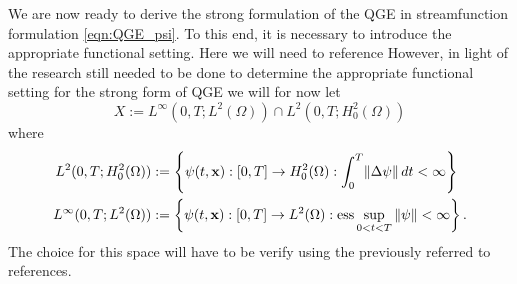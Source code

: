 We are now ready to derive the strong formulation of the QGE in streamfunction
formulation \eqref{eqn:QGE_psi}. To this end, it is necessary to introduce the
appropriate functional setting.  Here we will need to reference \cite{Braess,
Ciarlet, Cascon, GunzburgerApprox, GunzburgerMethods, Gunzburger89, Layton08,
Girault79, Girault79, Medjo99} However, in light of the research still needed to
be done to determine the appropriate functional setting for the strong form of
QGE we will for now let
\begin{equation*}
  X := L^{\infty}(0, T; L^2(\Omega)) \cap L^2(0, T;H^2_0(\Omega))
\end{equation*}
where
\begin{align*}
  L^2(0, T;H^2_0(\Omega)) &:= \left\{ \psi(t,\mathbf{x}):[0, T] \to H^2_0(\Omega):
    \int_{0}^{T}\! \|\Delta \psi\| \, dt < \infty \right\} \\
  L^{\infty}(0, T;L^2(\Omega)) &:= \left\{ \psi(t,\mathbf{x}):[0, T] \to L^2(\Omega):
    \operatorname{ess} \sup_{0<t<T} \|\psi\| < \infty\right\}.
\end{align*}
The choice for this space will have to be verify using the previously referred
to references.

